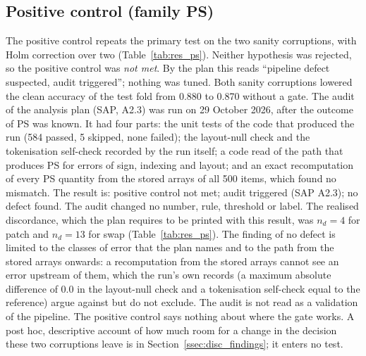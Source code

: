 \subsection{Positive control (family PS)}\label{ssec:res_ps}
The positive control repeats the primary test on the two sanity corruptions, with Holm correction over two (Table~\ref{tab:res_ps}).
Neither hypothesis was rejected, so the positive control was \emph{not met}.
By the plan this reads ``pipeline defect suspected, audit triggered''; nothing was tuned.
Both sanity corruptions lowered the clean accuracy of the test fold from 0.880 to 0.870 without a gate.
The audit of the analysis plan (SAP, A2.3) was run on 29 October 2026, after the outcome of PS was known.
It had four parts: the unit tests of the code that produced the run (584 passed, 5 skipped, none failed); the layout-null check and
the tokenisation self-check recorded by the run itself; a code read of the path that produces PS for errors of sign, indexing and layout; and an exact
recomputation of every PS quantity from the stored arrays of all 500 items, which found no mismatch.
The result is: positive control not met; audit triggered (SAP A2.3); no defect found.
The audit changed no number, rule, threshold or label.
The realised discordance, which the plan requires to be printed with this result, was $n_d=4$ for patch and $n_d=13$ for swap
(Table~\ref{tab:res_ps}).
The finding of no defect is limited to the classes of error that the plan names and to the path from the stored arrays onwards: a
recomputation from the stored arrays cannot see an error upstream of them, which the run's own records (a maximum absolute difference of 0.0 in the layout-null check and a tokenisation self-check equal to the
reference) argue against but do not exclude.
The audit is not read as a validation of the pipeline.
The positive control says nothing about where the gate works.
A post hoc, descriptive account of how much room for a change in the decision these two corruptions leave is in
Section~\ref{ssec:disc_findings}; it enters no test.

